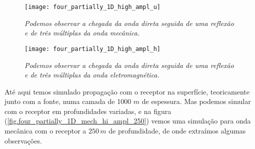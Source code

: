 \begin{figure}
\centering
\texttt{[image: four\_partially\_1D\_high\_ampl\_u]}\\
\caption{\textit{Podemos observar a chegada da onda direta seguida de uma reflex\~ao e de tr\^es m\'ultiplas da onda mec\^anica.}}
\label{fig.four_partially_1D_mech_hi_ampl}
\end{figure}


\begin{figure}
\centering
\texttt{[image: four\_partially\_1D\_high\_ampl\_h]}\\
\caption{\textit{Podemos observar a chegada da onda direta seguida de uma reflex\~ao e de tr\^es m\'ultiplas da onda eletromagn\'etica.}}
\label{fig.four_partially_1D_electro_hi_ampl}
\end{figure}

At\'e aqui temos simulado propaga\c{c}\~ao com o receptor na superf\'icie, teoricamente junto com a fonte, numa camada de 1000 $m$ de espessura. Mas podemos simular com o receptor em profundidades variadas, e na figura (\ref{fig.four_partially_1D_mech_hi_ampl_250}) vemos uma simula\c{c}\~ao para onda mec\^anica com o receptor a $250\,m$ de profundidade, de onde extra\'imos algumas observa\c{c}\~oes.

